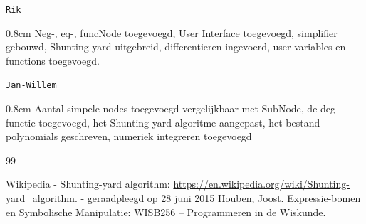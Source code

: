 \documentclass[a4paper]{article}
\newcommand{\com}[2]{\texttt{#1}\mbox{}\vspace{-2ex}\begin{adjustwidth}{0.8cm}{} #2 \end{adjustwidth}}
\begin{document}
\com{Rik} {Neg-, eq-, funcNode toegevoegd, User Interface toegevoegd, simplifier gebouwd, Shunting yard uitgebreid, differentieren ingevoerd, user variables en functions toegevoegd.}

\com{Jan-Willem} {Aantal simpele nodes toegevoegd vergelijkbaar met SubNode, de deg functie toegevoegd, het Shunting-yard algoritme aangepast, het bestand polynomials geschreven, numeriek integreren toegevoegd}


\begin{thebibliography}{99}

 Wikipedia - Shunting-yard algorithm:
\url{https://en.wikipedia.org/wiki/Shunting-yard_algorithm}. 
 - geraadpleegd op 28 juni 2015
  Houben, Joost. Expressie-bomen en Symbolische Manipulatie: WISB256 – Programmeren in de Wiskunde.


\end{thebibliography}
\end{document}
